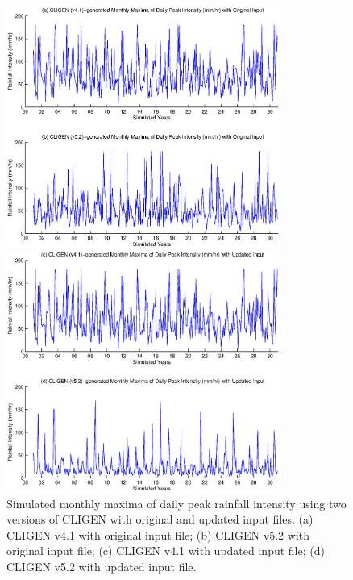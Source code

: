 \begin{figure}[htbp]
  \centering

\includegraphics[width=0.8\textwidth]{./img/cligen_monthly_max_int_org}

\includegraphics[width=0.8\textwidth]{./img/cligen_monthly_max_int_mod}
  \caption[Simulated monthly maxima of daily peak rainfall intensity using
two versions of CLIGEN with original and updated input files]{Simulated monthly
maxima of daily peak rainfall intensity using two versions of CLIGEN with
original and updated input files. (a) CLIGEN v4.1 with original input file; (b)
CLIGEN v5.2 with original input file; (c) CLIGEN v4.1 with updated input file;
(d) CLIGEN v5.2 with updated input file.}
  \label{fig:cligen_monthly_max_int}
\end{figure}

